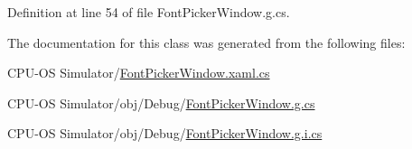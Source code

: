 Definition at line 54 of file Font\+Picker\+Window.\+g.\+cs.



The documentation for this class was generated from the following files\+:\begin{DoxyCompactItemize}
\item 
C\+P\+U-\/\+O\+S Simulator/\hyperlink{_font_picker_window_8xaml_8cs}{Font\+Picker\+Window.\+xaml.\+cs}\item 
C\+P\+U-\/\+O\+S Simulator/obj/\+Debug/\hyperlink{_debug_2_font_picker_window_8g_8cs}{Font\+Picker\+Window.\+g.\+cs}\item 
C\+P\+U-\/\+O\+S Simulator/obj/\+Debug/\hyperlink{_debug_2_font_picker_window_8g_8i_8cs}{Font\+Picker\+Window.\+g.\+i.\+cs}\end{DoxyCompactItemize}
